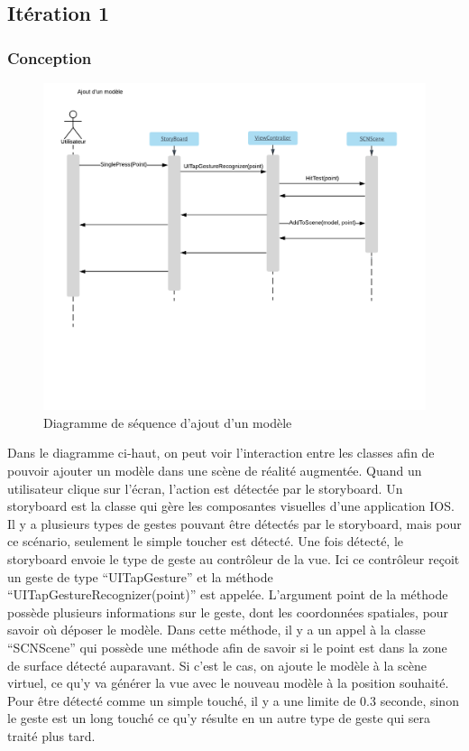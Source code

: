 \documentclass[rapport.tex]{subfiles}
\begin{document}
\subsection*{Itération 1}
\subsubsection*{Conception}
\begin{figure}[H]
    \includegraphics[width=\textwidth]{DSS_AjoutModels.png}
\centering
    \caption{Diagramme de séquence d'ajout d'un modèle}
\end{figure}
Dans le diagramme ci-haut, on peut voir l'interaction entre les classes afin de pouvoir ajouter un modèle dans une scène de réalité augmentée. Quand un utilisateur clique sur l’écran, l’action est détectée par le storyboard. Un storyboard est la classe qui gère les composantes visuelles d’une application IOS. Il y a plusieurs types de gestes pouvant être détectés par le storyboard, mais pour ce scénario, seulement le simple toucher est détecté. Une fois détecté, le storyboard envoie le type de geste au contrôleur de la vue. Ici ce contrôleur reçoit un geste de type “UITapGesture” et la méthode “UITapGestureRecognizer(point)” est appelée. L’argument point de la méthode possède plusieurs informations sur le geste, dont les coordonnées spatiales, pour savoir où déposer le modèle. Dans cette méthode, il y a un appel à la classe “SCNScene” qui possède une méthode afin de savoir si le point est dans la zone de surface détecté auparavant. Si c’est le cas, on ajoute le modèle à la scène virtuel, ce qu’y va générer la vue avec le nouveau modèle à la position souhaité. Pour être détecté comme un simple touché, il y a une limite de 0.3 seconde, sinon le geste est un long touché ce qu’y résulte en un autre type de geste qui sera traité plus tard.
\newpage
\end{document}
